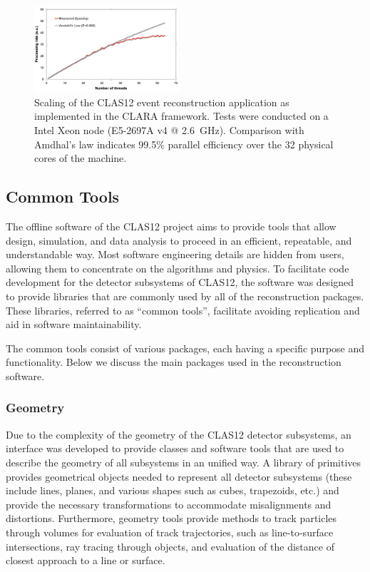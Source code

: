 \begin{figure}
\centering
\includegraphics[width=0.48\textwidth]{pics/scaling.png}
\caption{Scaling of the CLAS12 event reconstruction application as implemented in the CLARA framework. Tests
  were conducted on a Intel Xeon node (E5-2697A v4 @ 2.6~GHz). Comparison with Amdhal's law indicates 99.5\%
  parallel efficiency over the 32 physical cores of the machine.}
\label{fig:scaling}
\end{figure}

\subsection{Common Tools}
\label{common-tools}

The offline software of the CLAS12 project aims to provide tools that allow design, simulation, and data analysis
to proceed in an efficient, repeatable, and understandable way. Most  software engineering details are hidden from
users, allowing them to concentrate on the algorithms and physics. To facilitate code development for the detector
subsystems of CLAS12, the software was designed to provide libraries that are commonly used by all of the
reconstruction packages.  These libraries, referred to as ``common tools'', facilitate avoiding replication and aid
in software maintainability.

The common tools consist of various packages, each having a specific purpose and functionality. Below we discuss
the main packages used in the reconstruction software.

\subsubsection{Geometry}

Due to the complexity of the geometry of the CLAS12 detector subsystems, an interface was developed to provide
classes and software tools that are used to describe the geometry of all subsystems in an unified way.  A library of
primitives provides geometrical objects needed to represent all detector subsystems (these include lines, planes,
and various shapes such as cubes, trapezoids, etc.) and provide the necessary transformations to accommodate
misalignments and distortions.  Furthermore, geometry tools provide methods to track particles through volumes for
evaluation of track trajectories, such as line-to-surface intersections, ray tracing through objects, and evaluation of
the distance of closest approach to a line or surface.

